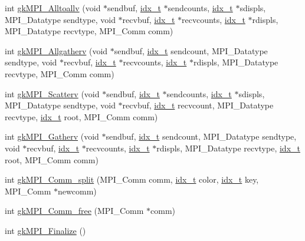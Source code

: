 \begin{DoxyCompactItemize}
\item 
int \hyperlink{a00359_ae0651b090fd2a6a021996fc1998a429c}{gk\+M\+P\+I\+\_\+\+Alltoallv} (void $\ast$sendbuf, \hyperlink{a00876_aaa5262be3e700770163401acb0150f52}{idx\+\_\+t} $\ast$sendcounts, \hyperlink{a00876_aaa5262be3e700770163401acb0150f52}{idx\+\_\+t} $\ast$sdispls, M\+P\+I\+\_\+\+Datatype sendtype, void $\ast$recvbuf, \hyperlink{a00876_aaa5262be3e700770163401acb0150f52}{idx\+\_\+t} $\ast$recvcounts, \hyperlink{a00876_aaa5262be3e700770163401acb0150f52}{idx\+\_\+t} $\ast$rdispls, M\+P\+I\+\_\+\+Datatype recvtype, M\+P\+I\+\_\+\+Comm comm)
\item 
int \hyperlink{a00359_a0b0b0098f344cad26f02c6f825bdde2c}{gk\+M\+P\+I\+\_\+\+Allgatherv} (void $\ast$sendbuf, \hyperlink{a00876_aaa5262be3e700770163401acb0150f52}{idx\+\_\+t} sendcount, M\+P\+I\+\_\+\+Datatype sendtype, void $\ast$recvbuf, \hyperlink{a00876_aaa5262be3e700770163401acb0150f52}{idx\+\_\+t} $\ast$recvcounts, \hyperlink{a00876_aaa5262be3e700770163401acb0150f52}{idx\+\_\+t} $\ast$rdispls, M\+P\+I\+\_\+\+Datatype recvtype, M\+P\+I\+\_\+\+Comm comm)
\item 
int \hyperlink{a00359_a08990d66eed081828d6addc2e5affde3}{gk\+M\+P\+I\+\_\+\+Scatterv} (void $\ast$sendbuf, \hyperlink{a00876_aaa5262be3e700770163401acb0150f52}{idx\+\_\+t} $\ast$sendcounts, \hyperlink{a00876_aaa5262be3e700770163401acb0150f52}{idx\+\_\+t} $\ast$sdispls, M\+P\+I\+\_\+\+Datatype sendtype, void $\ast$recvbuf, \hyperlink{a00876_aaa5262be3e700770163401acb0150f52}{idx\+\_\+t} recvcount, M\+P\+I\+\_\+\+Datatype recvtype, \hyperlink{a00876_aaa5262be3e700770163401acb0150f52}{idx\+\_\+t} root, M\+P\+I\+\_\+\+Comm comm)
\item 
int \hyperlink{a00359_a807659087675fb1da493b8dd6d4396b0}{gk\+M\+P\+I\+\_\+\+Gatherv} (void $\ast$sendbuf, \hyperlink{a00876_aaa5262be3e700770163401acb0150f52}{idx\+\_\+t} sendcount, M\+P\+I\+\_\+\+Datatype sendtype, void $\ast$recvbuf, \hyperlink{a00876_aaa5262be3e700770163401acb0150f52}{idx\+\_\+t} $\ast$recvcounts, \hyperlink{a00876_aaa5262be3e700770163401acb0150f52}{idx\+\_\+t} $\ast$rdispls, M\+P\+I\+\_\+\+Datatype recvtype, \hyperlink{a00876_aaa5262be3e700770163401acb0150f52}{idx\+\_\+t} root, M\+P\+I\+\_\+\+Comm comm)
\item 
int \hyperlink{a00359_a37b086e8008a4fd0406c128c0660b0da}{gk\+M\+P\+I\+\_\+\+Comm\+\_\+split} (M\+P\+I\+\_\+\+Comm comm, \hyperlink{a00876_aaa5262be3e700770163401acb0150f52}{idx\+\_\+t} color, \hyperlink{a00876_aaa5262be3e700770163401acb0150f52}{idx\+\_\+t} key, M\+P\+I\+\_\+\+Comm $\ast$newcomm)
\item 
int \hyperlink{a00359_a2e7ef47df4a06a51305a9de602b41262}{gk\+M\+P\+I\+\_\+\+Comm\+\_\+free} (M\+P\+I\+\_\+\+Comm $\ast$comm)
\item 
int \hyperlink{a00359_a0840d526fdede1b9db4fd5f722560a8b}{gk\+M\+P\+I\+\_\+\+Finalize} ()
\end{DoxyCompactItemize}



